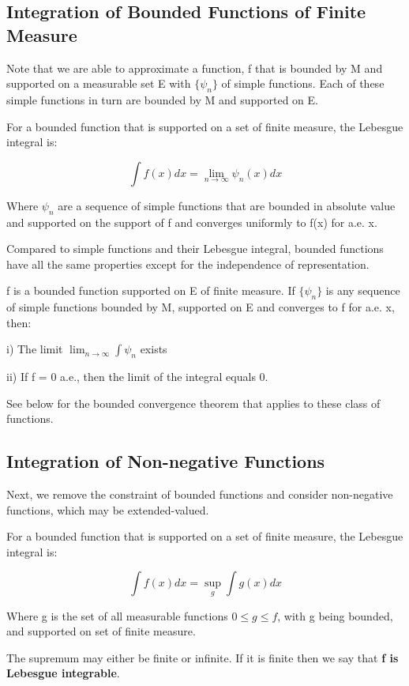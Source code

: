 \documentclass[class=article, crop=false]{standalone}
\begin{document}
	\subsection{Integration of Bounded Functions of Finite Measure}
		Note that we are able to approximate a function, f that is bounded by M and supported on a measurable set E with $\{\psi_n\}$ of simple functions. Each of these simple functions in turn are bounded by M and supported on E. 

		\begin{definition} 
			For a bounded function that is supported on a set of finite measure, the Lebesgue integral is:

			$$\int f(x) dx = \lim_{n\rightarrow\infty} \psi_n(x) dx$$

			Where $\psi_n$ are a sequence of simple functions that are bounded in absolute value and supported on the support of f and converges uniformly to f(x) for a.e. x.
		\end{definition}

		Compared to simple functions and their Lebesgue integral, bounded functions have all the same properties except for the independence of representation.

		\begin{lemma}
			f is a bounded function supported on E of finite measure. If $\{\psi_n\}$ is any sequence of simple functions bounded by M, supported on E and converges to f for a.e. x, then:

			i) The limit $\lim_{n\rightarrow\infty} \int \psi_n$ exists

			ii) If f = 0 a.e., then the limit of the integral equals 0.
		\end{lemma}

		See below for the bounded convergence theorem that applies to these class of functions.
	\subsection{Integration of Non-negative Functions}
		Next, we remove the constraint of bounded functions and consider non-negative functions, which may be extended-valued.

		\begin{definition} 
			For a bounded function that is supported on a set of finite measure, the Lebesgue integral is:

			$$\int f(x) dx = \sup_g \int g(x) dx$$

			Where g is the set of all measurable functions $0 \le g \le f$, with g being bounded, and supported on set of finite measure.

			The supremum may either be finite or infinite. If it is finite then we say that \textbf{f is Lebesgue integrable}.
		\end{definition}
\end{document}
